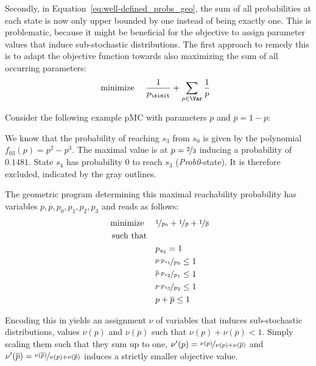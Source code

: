 Secondly, in Equation~\ref{eq:well-defined_probs_geo}, the sum of all probabilities at each state is now only upper bounded by one instead of being exactly one. This is problematic, because it might be beneficial for the objective to assign parameter values that induce sub-stochastic distributions. The first approach to remedy this is to adapt the objective function towards also maximizing the sum of all occurring parameters:
\begin{align}
			\text{ minimize } &\quad \frac{1}{p_{\sinit}} + \sum_{p\in\Var}\frac{1}{p}\label{eq:min_geo_relax1}
\end{align}

Consider the following example pMC with parameters $p$ and $\overline p = 1-p$:
\begin{figure*}
	\centering	
\end{figure*}
%

We know that the probability of reaching $s_3$ from $s_0$ is given by the polynomial $f_{03}(p)=p^2-p^3$. The maximal value is at $p=\nicefrac{2}{3}$ inducing a probability of $0.1481$. State $s_4$ has probability $0$ to reach $s_3$ (\textit{Prob0}-state). It is therefore excluded, indicated by the gray outlines.

The geometric program determining this maximal reachability probability has variables $p,\overline p, p_0,p_1,p_2,p_3$ and reads as follows:
\begin{align}
			\text{ minimize } &\quad \nicefrac{1}{p_{0}} + \nicefrac{1}{p} + \nicefrac{1}{\overline p}\\
			\text{such that}\\
			&\quad p_{s_3}=1\\
			&\quad  \nicefrac{p\cdot p_{s_1}} {p_0} \leq 1\\
			&\quad  \nicefrac{\overline p\cdot p_{s_2}} {p_1} \leq 1\\
			&\quad  \nicefrac{p\cdot p_{s_3}} {p_2} \leq 1\\
			&\quad p+\overline p\leq 1\label{eq:well-defined_probs_geo}
		\end{align}


Encoding this in  yields an assignment $\nu$ of variables that induces sub-stochastic distributions, \ie values $\nu(p)$ and $\nu(\overline p)$ such that $\nu(p)+\nu(\overline p)<1$. Simply scaling them such that they sum up to one, \ie $\nu'(p)=\nicefrac{\nu(p)}{\nu(p)+\nu(\overline p)}$ and $\nu'(\overline p)=\nicefrac{\nu(\overline p)}{\nu(p)+\nu(\overline p)}$ induces a strictly smaller objective value. 

